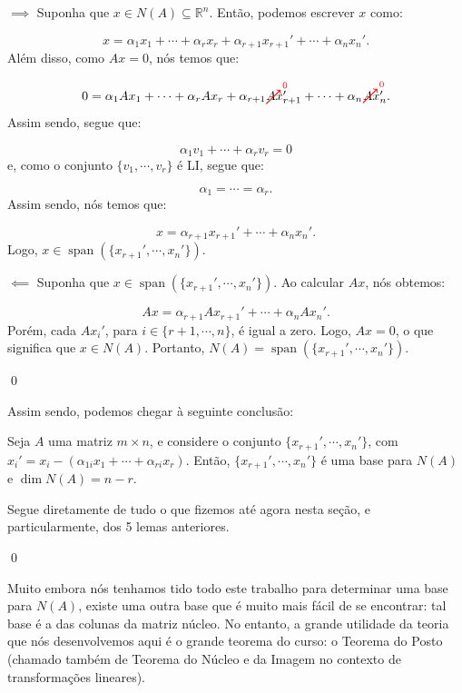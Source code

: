 \begin{Proof}
	$\implies$ Suponha que $x\in N(A)\subseteq\mathbb{R}^n$. Então, podemos escrever $x$ como:
	
	$$
	x = \alpha_1x_1 + \cdots + \alpha_rx_r + \alpha_{r + 1}x_{r + 1}' + \cdots + \alpha_nx_n'.
	$$
	Além disso, como $Ax = 0$, nós temos que:
	
	$$
	0 = \alpha_1Ax_1 + \cdots + \alpha_rAx_r + \alpha_{r + 1}\canceltozero{Ax_{r + 1}'} + \cdots + \alpha_n\canceltozero{Ax_n'}.
	$$
	Assim sendo, segue que:
	
	$$
	\alpha_1v_1 + \cdots + \alpha_rv_r = 0
	$$
	e, como o conjunto $\{v_1, \cdots, v_r\}$ é LI, segue que:
	
	$$
	\alpha_1 = \cdots = \alpha_r.
	$$
	Assim sendo, nós temos que:
	
	$$
	x = \alpha_{r + 1}x_{r + 1}' + \cdots + \alpha_nx_n'.
	$$
	Logo, $x\in\operatorname{span}(\{x_{r + 1}', \cdots, x_n'\})$.
	
	$\impliedby$ Suponha que $x\in\operatorname{span}(\{x_{r + 1}', \cdots, x_n'\})$. Ao calcular $Ax$, nós obtemos:
	
	$$
	Ax = \alpha_{r + 1}Ax_{r + 1}' + \cdots + \alpha_nAx_n'.
	$$
	Porém, cada $Ax_i'$, para $i\in\{r + 1, \cdots, n\}$, é igual a zero. Logo, $Ax = 0$, o que significa que $x\in N(A)$. Portanto, $N(A) = \operatorname{span}(\{x_{r + 1}', \cdots, x_n'\})$.
	
	\qed
\end{Proof}

Assim sendo, podemos chegar à seguinte conclusão:

\begin{Theorem}
	Seja $A$ uma matriz $m\times n$, e considere o conjunto $\{x_{r + 1}', \cdots, x_n'\}$, com $x_i' = x_i - (\alpha_{1i}x_1 + \cdots + \alpha_{ri}x_r)$. Então, $\{x_{r + 1}', \cdots, x_n'\}$ é uma base para $N(A)$ e $\dim N(A) = n - r$.
\end{Theorem}

\begin{Proof}
	Segue diretamente de tudo o que fizemos até agora nesta seção, e particularmente, dos 5 lemas anteriores.
	
	\qed
\end{Proof}

Muito embora nós tenhamos tido todo este trabalho para determinar uma base para $N(A)$, existe uma outra base que é muito mais fácil de se encontrar: tal base é a das colunas da matriz núcleo. No entanto, a grande utilidade da teoria que nós desenvolvemos aqui é o grande teorema do curso: o Teorema do Posto (chamado também de Teorema do Núcleo e da Imagem no contexto de transformações lineares).

